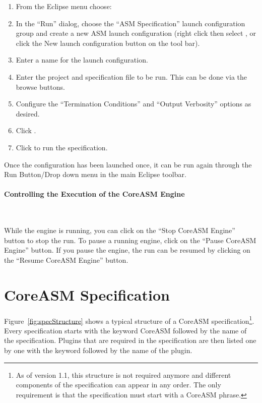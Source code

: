 \documentclass{article}
\newcommand{\CoreASM}{{\sffamily CoreASM}\xspace}
\begin{document}
\begin{enumerate}
    \item From the Eclipse menu choose: 
	\item In the ``Run'' dialog, choose the ``ASM Specification'' launch configuration
group and create a new ASM launch configuration (right click then select , or
click the New launch configuration button on the tool bar).
    \item Enter a name for the launch configuration.
    \item Enter the project and specification file to be run. This can be done via the browse buttons.
    \item Configure the ``Termination Conditions'' and ``Output Verbosity'' options as desired.
    \item Click .
    \item Click  to run the specification. 
\end{enumerate}

Once the configuration has been launched once, it can be run again through the Run Button/Drop down menu in the main Eclipse toolbar.

\paragraph{Controlling the Execution of the \CoreASM Engine} ~

While the engine is running, you can click on the 
``Stop CoreASM Engine'' button to stop the run. To pause a running engine, 
click on the ``Pause CoreASM Engine'' button. If you pause the engine, the 
run can be resumed by clicking on the ``Resume CoreASM Engine'' button. 

\section{\CoreASM Specification}


Figure~\ref{fig:specStructure} shows a typical structure of a \CoreASM specification\footnote{
As of version 1.1, this structure is not required anymore and different components of the specification
can appear in any order. The only requirement is that the specification must start with a \CoreASM
phrase.}.
Every specification starts with the keyword \CoreASM\index{CoreASM@\CoreASM} followed by the name
of the specification. Plugins that are required in the specification are then listed one by 
one with the keyword  followed by the name of the plugin. 
\end{document}
